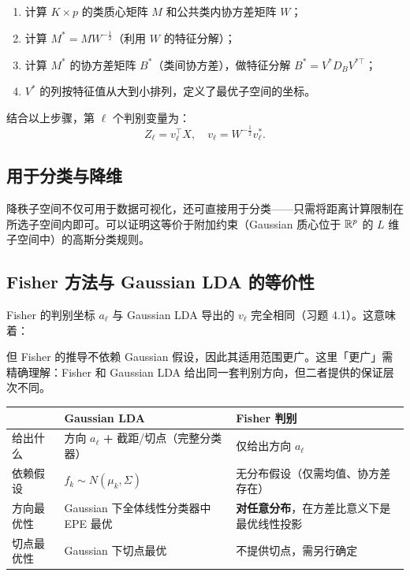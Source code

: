 \begin{enumerate}[label=(\arabic*)]
    \item 计算 $K \times p$ 的类质心矩阵 $M$ 和公共类内协方差矩阵 $W$；
    \item 计算 $M^* = M W^{-\frac12}$（利用 $W$ 的特征分解）；
    \item 计算 $M^*$ 的协方差矩阵 $B^*$（类间协方差），做特征分解 $B^* = V^* D_B V^{*\top}$；
    \item $V^*$ 的列按特征值从大到小排列，定义了最优子空间的坐标。
\end{enumerate}

结合以上步骤，第 $\ell$ 个判别变量为：
\[
Z_\ell = v_\ell^\top X, \quad v_\ell = W^{-\frac12} v_\ell^*.
\]

\subsection{用于分类与降维}

降秩子空间不仅可用于数据可视化，还可直接用于分类——只需将距离计算限制在所选子空间内即可。可以证明这等价于附加约束（Gaussian 质心位于 $\mathbb{R}^p$ 的 $L$ 维子空间中）的高斯分类规则。

\subsection{Fisher 方法与 Gaussian LDA 的等价性}

Fisher 的判别坐标 $a_\ell$ 与 Gaussian LDA 导出的 $v_\ell$ 完全相同（习题 4.1）。这意味着：

\begin{center}
\end{center}

但 Fisher 的推导不依赖 Gaussian 假设，因此其适用范围更广。这里「更广」需精确理解：Fisher 和 Gaussian LDA 给出同一套判别方向，但二者提供的保证层次不同。

\begin{center}
\begin{tabular}{lll}
\toprule
& Gaussian LDA & Fisher 判别 \\
\midrule
给出什么 & 方向 $a_\ell$ \textbf{+} 截距/切点（完整分类器） & 仅给出方向 $a_\ell$ \\
依赖假设 & $f_k \sim N(\mu_k, \Sigma)$ & 无分布假设（仅需均值、协方差存在） \\
方向最优性 & Gaussian 下全体线性分类器中 EPE 最优 & \textbf{对任意分布}，在方差比意义下是最优线性投影 \\
切点最优性 & Gaussian 下切点最优 & 不提供切点，需另行确定 \\
\bottomrule
\end{tabular}
\end{center}

